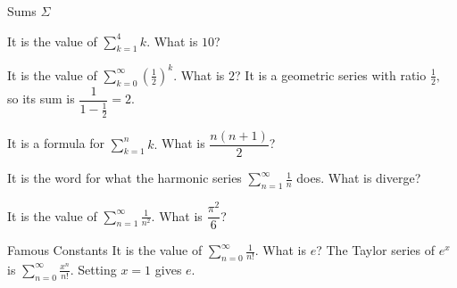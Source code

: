 \documentclass{article}
\begin{document}
\begin{category}{Sums $\Sigma$}

  \begin{clue}[say]
    It is the value of $\displaystyle\sum_{k=1}^{4} k.$
  \response
    What is $10$?
  \end{clue}

  \begin{clue}[say]
    It is the value of $\displaystyle\sum_{k=0}^{\infty} \left(\frac{1}{2}\right)^k.$
  \response
    What is $2$?
  \solution
    It is a geometric series with ratio $\frac{1}{2},$ so its sum is
    $\dfrac{1}{1 - \frac{1}{2}} = 2.$
  \end{clue}

  \begin{clue}[write]
    It is a formula for $\displaystyle\sum_{k=1}^{n} k.$
  \response
    What is $\dfrac{n(n+1)}{2}$?
  \end{clue}

  \begin{clue}[say]
    It is the word for what the harmonic series
    $\displaystyle\sum_{n=1}^{\infty} \frac{1}{n}$ does.
  \response
    What is diverge?
  \end{clue}

  \begin{clue}[say]
    It is the value of $\displaystyle\sum_{n=1}^{\infty} \frac{1}{n^2}.$
  \response
    What is $\dfrac{\pi^2}{6}$?
  \end{clue}

\end{category}

\begin{final}{Famous Constants}
  It is the value of $\displaystyle\sum_{n=0}^{\infty} \frac{1}{n!}.$
\response
  What is $e$?
\solution
  The Taylor series of $e^x$ is $\displaystyle\sum_{n=0}^{\infty} \frac{x^n}{n!}.$
  Setting $x = 1$ gives $e.$
\end{final}
\end{document}
